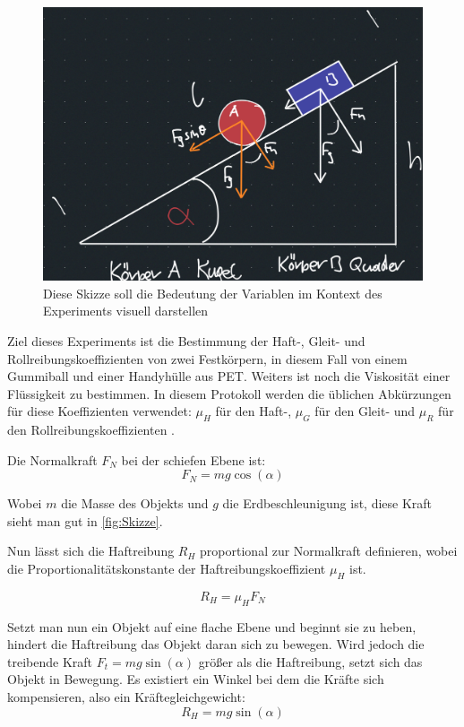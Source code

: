 \documentclass[11pt,ngerman]{scrartcl}
\begin{document}
\begin{figure}[H]
    \centering
    \includegraphics[width=0.8\linewidth]{pics/Skizze.png}
    \caption{Diese Skizze soll die Bedeutung der Variablen im Kontext des Experiments 
    visuell darstellen}%
    \label{fig:Skizze}
\end{figure}

Ziel dieses Experiments ist die Bestimmung der Haft-, Gleit- und
Rollreibungskoeffizienten von zwei Festkörpern, in diesem Fall von einem
Gummiball und einer Handyhülle aus PET. Weiters ist noch die Viskosität einer
Flüssigkeit zu bestimmen. In diesem Protokoll werden die üblichen Abkürzungen
für diese Koeffizienten verwendet: $\mu_H$ für den Haft-, $\mu_G$ für den Gleit- und $\mu_R$
für den Rollreibungskoeffizienten \cite{Knoll2020}.

Die Normalkraft $F_N$ bei der schiefen Ebene ist:
\begin{equation}
    F_N = mg \cos(\alpha) \label{eq:FN_schiefebene}
\end{equation}

Wobei $m$ die Masse des Objekts und $g$ die Erdbeschleunigung ist, diese
Kraft sieht man gut in \autoref{fig:Skizze}.

Nun lässt sich die Haftreibung $R_H$ proportional zur Normalkraft definieren,
wobei die Proportionalitätskonstante der Haftreibungskoeffizient $\mu_H$ ist.

\begin{equation}
    R_H = \mu_H F_N \label{eq:haftreibungkraft}
\end{equation}

Setzt man nun ein Objekt auf eine flache Ebene und beginnt sie zu heben, hindert
die Haftreibung das Objekt daran sich zu bewegen. Wird jedoch die treibende
Kraft $F_t = mg \sin(\alpha)$ größer als die Haftreibung, setzt sich das Objekt
in Bewegung. Es existiert ein Winkel bei dem die Kräfte sich kompensieren, also
ein Kräftegleichgewicht:
\begin{equation}
    R_H = mg \sin(\alpha)
\end{equation}
\end{document}
